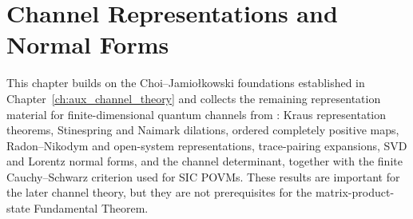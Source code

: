 \chapter{Channel Representations and Normal Forms}\label{ch:channel_representations}

This chapter builds on the Choi--Jamio\l{}kowski foundations established in
Chapter~\ref{ch:aux_channel_theory} and collects the remaining representation material for
finite-dimensional quantum channels from \cite[Chapter~2]{Wolf2012Quantum}:
Kraus representation theorems, Stinespring and Naimark dilations, ordered
completely positive maps, Radon--Nikodym and open-system representations,
trace-pairing expansions, SVD and Lorentz normal forms, and the channel
determinant, together with the finite Cauchy--Schwarz criterion used for SIC POVMs.
These results are important for the later channel theory, but they
are not prerequisites for the matrix-product-state Fundamental Theorem.



